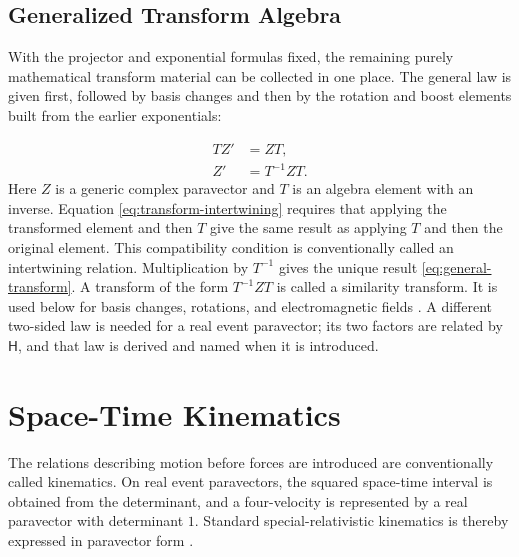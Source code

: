 \documentclass[10pt,letterpaper]{article}
\newcommand{\pv}[1]{#1}
\newcommand{\Hop}{\mathsf H}
\begin{document}
\subsection{Generalized Transform Algebra}\label{sec:transform-algebra}
With the projector and exponential formulas fixed, the remaining purely
mathematical transform material can be collected in one place. The general
law is given first, followed by basis changes and then by the rotation and
boost elements built from the earlier exponentials:

\begin{align}
\pv{T}\pv{Z}'&=\pv{Z}\pv{T},
\label{eq:transform-intertwining}\\
\pv{Z}'&=\pv{T}^{-1}\pv{Z}\pv{T}.
\label{eq:general-transform}
\end{align}
Here \(\pv{Z}\) is a generic complex paravector and \(\pv{T}\) is an algebra
element with an inverse. Equation \eqref{eq:transform-intertwining} requires
that applying the transformed element and then \(\pv{T}\) give the same result
as applying \(\pv{T}\) and then the original element. This compatibility
condition is conventionally called an intertwining relation. Multiplication
by \(\pv{T}^{-1}\) gives the unique result
\eqref{eq:general-transform}. A transform of the form
\(\pv{T}^{-1}\pv{Z}\pv{T}\) is called a similarity transform. It is used below
for basis changes, rotations, and electromagnetic fields
\cite{hestenes1966,baylis1999,doran2003}. A different two-sided law is needed
for a real event paravector; its two factors are related by \(\Hop\), and
that law is derived and named when it is introduced.



\section{Space-Time Kinematics}\label{sec:spacetime}
The relations describing motion before forces are introduced are
conventionally called kinematics. On real event paravectors, the squared
space-time interval is obtained from the determinant, and a four-velocity is
represented by a real paravector with determinant \(1\). Standard
special-relativistic kinematics is thereby expressed in paravector form
\cite{lorentz1904,einstein1905,minkowski1908,hestenes1966,baylis1999}.
\end{document}
